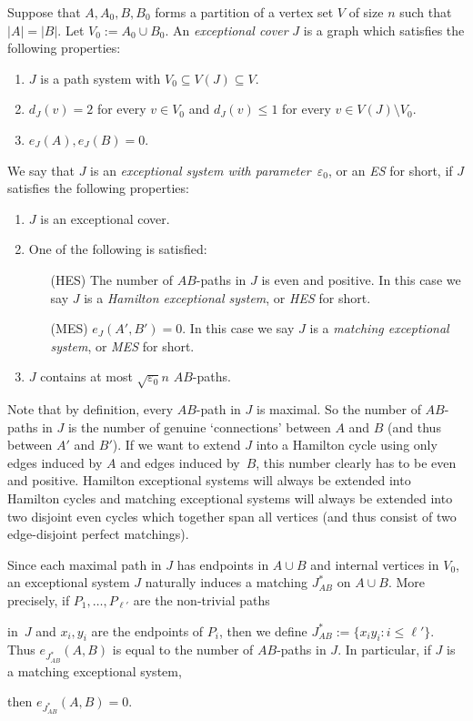 \documentclass{memo-l}
\def\COMMENT#1{}
\def\eps{\varepsilon}
\def\epszero{\eps_0}
\numberwithin{section}{chapter}
\numberwithin{equation}{section}
\numberwithin{firstthm}{section}
\numberwithin{figure}{section}
\begin{document}
Suppose that $A,A_0,B,B_0$ forms a partition of a vertex set $V$ of size $n$ such that $|A| = |B|$. Let $V_0:=A_0\cup B_0$.
An \emph{exceptional cover} $J$ is a graph which satisfies the following properties:
\begin{enumerate}[label={(EC{\arabic*})}]
\item $J$ is a path system with $V_0\subseteq V(J)\subseteq V$.%
   \COMMENT{One might set $V(J)=V$ instead. Or alternatively, $d_J(v)= 1$ for every $v \in V(J) \setminus V_0$.
However, this does not fit well with the bipartite case.}
\item $d_J(v) =2 $ for every $v \in V_0$ and $d_J(v) \le 1$ for every $v \in V(J) \setminus V_0$.
\item $e_J(A), e_J(B) = 0$.
\end{enumerate}
We say that $J$ is an \emph{exceptional system with parameter~$\eps_0$}, or an \emph{ES} for short, if $J$ satisfies the following properties:
\begin{enumerate}[label={(ES{\arabic*})}]
	\item $J$ is an exceptional cover.
	\item One of the following is satisfied:
	\begin{itemize}
	\item[(HES)] The number of $AB$-paths in $J$ is even and positive. In this case we say $J$ is a \emph{Hamilton exceptional system}, or \emph{HES} for short.
	\item[(MES)] $e_J(A',B')=0$. In this case we say $J$ is a \emph{matching exceptional system}, or \emph{MES} for short. 
\end{itemize}
	\item $J$ contains at most $\sqrt{\epszero} n $ $AB$-paths.
\end{enumerate}
Note that by definition, every $AB$-path in $J$ is maximal. 
So the number of $AB$-paths in $J$ is the number of genuine `connections' between $A$ and $B$
(and thus between $A'$ and $B'$).
If we want to extend $J$ into a Hamilton cycle using only edges induced by $A$ and edges induced by~$B$,
this number clearly has to be even and positive.
Hamilton exceptional systems will always be extended into Hamilton cycles and matching exceptional systems will
always be extended into two disjoint even cycles which together span all vertices (and thus consist of two edge-disjoint perfect matchings).

Since each maximal path in $J$ has endpoints in $A \cup B$ and internal vertices in $V_0$, an exceptional system $J$
naturally induces a matching $J^*_{AB}$ on $A \cup B$.
More precisely, if $P_1, \dots ,P_{\ell'}$ are the non-trivial paths%
   \COMMENT{Daniela: need non-trivial here (don't want to have loops for the isolated vertices in $J$). TO DO: have to change this
in paper~2 (I've already changed it in paper 3)}
in~$J$ and $x_i, y_i$ are the endpoints of $P_i$, then
we define $J^*_{AB} := \{x_iy_i : i  \le \ell'\}$. Thus $e_{J^*_{AB}}(A,B)$ is equal to the number of $AB$-paths in $J$.
In particular, if $J$ is a matching exceptional system,%
\COMMENT{The def of a MES had to change. The previous one was $e_{J^*_{AB}}(A,B)=0$.
But then Prop\ref{prop:ES}(ii) does not hold.}
then $e_{J^*_{AB}}(A,B)=0$.
\end{document}
